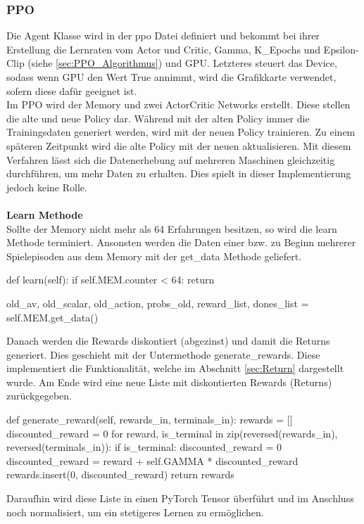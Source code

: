 \subsubsection{PPO}
Die Agent Klasse wird in der ppo Datei definiert und bekommt bei ihrer Erstellung die Lernraten vom Actor und Critic, Gamma, K\_Epochs und Epsilon-Clip (siehe \ref{sec:PPO_Algorithmus}) und GPU. Letzteres steuert das Device, sodass wenn GPU den Wert True annimmt, wird die Grafikkarte verwendet, sofern diese dafür geeignet ist.\\
Im PPO wird der Memory und zwei ActorCritic Networks erstellt. Diese stellen die alte und neue Policy dar. Während mit der alten Policy immer die Trainingsdaten generiert werden, wird mit der neuen Policy trainieren. Zu einem späteren Zeitpunkt wird die alte Policy mit der neuen aktualisieren. Mit diesem Verfahren lässt sich die Datenerhebung auf mehreren Maschinen gleichzeitig durchführen, um mehr Daten zu erhalten. Dies spielt in dieser Implementierung jedoch keine Rolle.\\
\\\textbf{Learn Methode}\\
Sollte der Memory nicht mehr als 64 Erfahrungen besitzen, so wird die learn Methode terminiert. Ansonsten werden die Daten einer bzw. zu Beginn mehrerer Spielepisoden aus dem Memory mit der get\_data Methode geliefert.
\begin{python}
    def learn(self):
		if self.MEM.counter < 64:
			return
		
		old_av, old_scalar, old_action, probs_old, reward_list, dones_list = self.MEM.get_data()
\end{python}
Danach werden die Rewards diskontiert (abgezinst) und damit die Returns generiert. Dies geschieht mit der Untermethode generate\_rewards. Diese implementiert die Funktionalität, welche im Abschnitt \ref{sec:Return} dargestellt wurde. Am Ende wird eine neue Liste mit diskontierten Rewards (Returns) zurückgegeben.
\begin{python}
	def generate_reward(self, rewards_in, terminals_in):
		rewards = []
		discounted_reward = 0
		for reward, is_terminal in zip(reversed(rewards_in), 
				  												 reversed(terminals_in)):
			if is_terminal:
				discounted_reward = 0
			discounted_reward = reward + self.GAMMA * discounted_reward
			rewards.insert(0, discounted_reward)
		return rewards
\end{python}
Daraufhin wird diese Liste in einen PyTorch Tensor überführt und im Anschluss noch normalisiert, um ein stetigeres Lernen zu ermöglichen.
